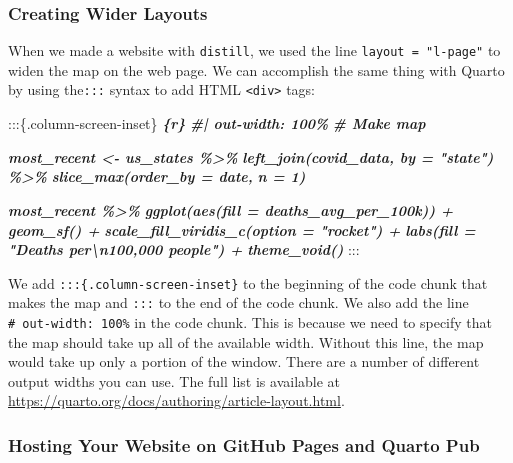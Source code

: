\documentclass[
]{book}
\newenvironment{Shaded}{\begin{snugshade}}{\end{snugshade}}
\newcommand{\InformationTok}[1]{\textcolor[rgb]{0.56,0.35,0.01}{\textbf{\textit{#1}}}}
\newcommand{\NormalTok}[1]{#1}
\begin{document}
\hypertarget{creating-wider-layouts}{%
\subsubsection*{Creating Wider Layouts}\label{creating-wider-layouts}}

When we made a website with \texttt{distill}, we used the line \texttt{layout\ =\ "l-page"} to widen the map on the web page. We can accomplish the same thing with Quarto by using the\texttt{:::} syntax to add HTML \texttt{\textless{}div\textgreater{}} tags:

\begin{Shaded}
\begin{Highlighting}[]
\NormalTok{:::\{.column{-}screen{-}inset\}}
\InformationTok{\textasciigrave{}\textasciigrave{}\textasciigrave{}\{r\}}
\InformationTok{\#| out{-}width: 100\%}
\InformationTok{\# Make map}

\InformationTok{most\_recent \textless{}{-} us\_states \%\textgreater{}\% }
\InformationTok{  left\_join(covid\_data, by = "state") \%\textgreater{}\% }
\InformationTok{  slice\_max(order\_by = date,}
\InformationTok{            n = 1) }

\InformationTok{most\_recent \%\textgreater{}\% }
\InformationTok{  ggplot(aes(fill = deaths\_avg\_per\_100k)) +}
\InformationTok{  geom\_sf() +}
\InformationTok{  scale\_fill\_viridis\_c(option = "rocket") +}
\InformationTok{  labs(fill = "Deaths per\textbackslash{}n100,000 people") +}
\InformationTok{  theme\_void()}
\InformationTok{\textasciigrave{}\textasciigrave{}\textasciigrave{}}
\NormalTok{:::}
\end{Highlighting}
\end{Shaded}

We add \texttt{:::\{.column-screen-inset\}} to the beginning of the code chunk that makes the map and \texttt{:::} to the end of the code chunk. We also add the line \texttt{\#\textbar{}\ out-width:\ 100\%} in the code chunk. This is because we need to specify that the map should take up all of the available width. Without this line, the map would take up only a portion of the window. There are a number of different output widths you can use. The full list is available at \url{https://quarto.org/docs/authoring/article-layout.html}.

\hypertarget{hosting-your-website-on-github-pages-and-quarto-pub}{%
\subsubsection*{Hosting Your Website on GitHub Pages and Quarto Pub}\label{hosting-your-website-on-github-pages-and-quarto-pub}}
\end{document}
